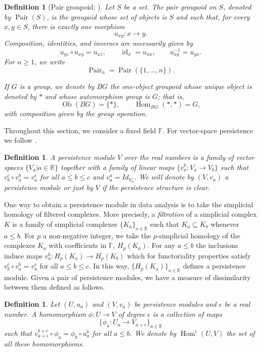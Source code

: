 \documentclass{amsart}
\newcommand{\R}{\mathbb{R}}
\newcommand{\ar}{\longrightarrow}
\DeclareMathOperator{\Hom}{Hom}
\newtheorem{definition}[theorem]{Definition}
\begin{document}
\begin{definition}[{Pair groupoid; \cite[Section~1.7, p.~26]{ronbrown2}}]
Let \(S\) be a set. The \textit{pair groupoid} on \(S\), denoted by
\(\operatorname{Pair}(S)\), is the groupoid whose set of objects is \(S\)
and such that, for every \(x,y\in S\), there is exactly one morphism
\[
u_{xy}\colon x\longrightarrow y.
\]
Composition, identities, and inverses are necessarily given by
\[
u_{yz}\circ u_{xy}=u_{xz},
\qquad
\operatorname{id}_x=u_{xx},
\qquad
u_{xy}^{-1}=u_{yx}.
\]
For \(n\geq 1\), we write
\[
\operatorname{Pair}_n
=
\operatorname{Pair}(\{1,\ldots,n\}).
\]

If \(G\) is a group, we denote by \(BG\) the one-object groupoid whose
unique object is denoted by \(*\) and whose automorphism group is \(G\);
that is,
\[
\operatorname{Ob}(BG)=\{*\},
\qquad
\Hom_{BG}(*,*)=G,
\]
with composition given by the group operation.
\end{definition}



Throughout this section, we consider a fixed field $\mathbb{F}$.
For vector-space persistence we follow \cite[Section~2, pp.~195--196]{chazal2014persistence_geom}.

\begin{definition}
A persistence module $V$ over the real numbers \cite[Section~2]{chazal2014persistence_geom} is a family of vector spaces $\{V_a|a\in \R\}$ together with a family of linear maps $\{v_a^b:V_a\ar V_b\}$ such that $v_b^c\circ v_a^b=v_a^c$ for all $a\leq b\leq c$ and $v_a^a=Id_{V_a}$. We will denote by $(V, v_a)$ a persistence module or just by $V$ if the persistence structure is clear. 
\end{definition}

One way to obtain a persistence module in data analysis is to take the simplicial homology of filtered complexes. More precisely, a \textit{filtration} of  a simplicial complex $K$ is a family of simplicial 
complexes $\{K_a\}_{a\in \R}$ such that $K_a\subseteq K_b$ whenever $a\leq b$. For $p$ a non-negative integer, we take the $p$-simplicial homology of the complexes $K_a$ with coefficients in $\mathbb{F}$, $H_p(K_a)$. For any $a\leq b $ the inclusions induce maps $v_a^b:H_p(K_a)\ar H_p(K_b)$ which for functoriality properties satisfy $v_b^c\circ v_a^b=v_a^c$ for all $a\leq b\leq c$. In this way, $\{H_p(K_a)\}_{a\in \R}$ defines a persistence module. Given a pair of persistence modules, we have a measure of dissimilarity between them defined as follows. 
\begin{definition}
    Let $(U, u_a)$ and $(V, v_a)$ be persistence modules and $\epsilon$ be a real number. A homomorphism $\phi:U\ar V$ of degree $\epsilon$ \cite[Section~2]{chazal2014persistence_geom} is a collection of maps $$\{\phi_a:U_a\ar V_{a+\epsilon}\}_{a\in \R}$$
    such that $v_{a+\epsilon}^{b+\epsilon}\circ\phi_a=\phi_{b}\circ u_a^b$ for all $a\leq b$. We denote by $\Hom ^\epsilon(U, V)$ the set of all these homomorphisms.
\end{definition}
\end{document}
